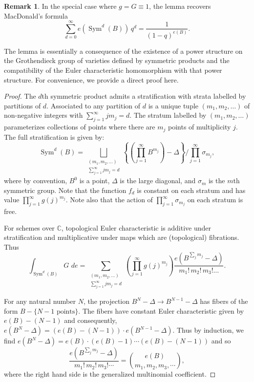 \documentclass[12pt]{amsart}
\theoremstyle{definition}
\newtheorem{remark}[theorem]{Remark}
\newcommand{\CC} {\mathbb{C}}          %
\newcommand{\Sym}{\operatorname{Sym}}
\begin{document}
\begin{remark} \label{MacD}
In the special case where $g=G\equiv  1$, the lemma recovers
MacDonald's formula $$\sum _{d=0}^{\infty }e (\Sym ^{d} (B)) \, q^{d} =
\frac{1}{(1-q)^{e (B)}}.$$ 

The lemma is essentially a consequence of the existence of a power
structure on the Grothendieck group of varieties defined by
symmetric products and the compatibility of the Euler characteristic
homomorphism with that power structure. For convenience, we provide a
direct proof here.
\end{remark}
\begin{proof}
The $d$th symmetric product admits a stratification with strata
labelled by partitions of $d$. Associated to any partition of $d$ is a
unique tuple $(m_{1},m_{2},\dots )$ of non-negative integers with
$\sum _{j=1}^{\infty }j m_{j}=d$. The stratum labelled by
$(m_{1},m_{2},\dots )$ parameterizes collections of points where there
are $m_{j}$ points of multiplicity $j$. The full stratification is
given by:
\[
\Sym ^{d} (B) = \bigsqcup_{\begin{smallmatrix} (m_{1},m_{2},\dots )\\
\sum _{j=1}^{\infty }j m_{j}=d  \end{smallmatrix}} \left\{\left(\prod _{j=1}^{\infty }B^{m_{j}} \right) -\Delta  \right\}/ \prod _{j=1}^{\infty }\sigma _{m_{j}}, 
\]
where by convention, $B^{0}$ is a point, $\Delta $ is the large
diagonal, and $\sigma _{m}$ is the $m$th symmetric group. Note that
the function $f_{d}$ is constant on each stratum and has value $\prod
_{j=1}^{\infty }g (j)^{m_{j}}$. Note also that the action of $\prod
_{j=1}^{\infty }\sigma _{m_{j}}$ on each stratum is free. 

For schemes over $\CC $, topological Euler characteristic is additive
under stratification and multiplicative under maps which are
(topological) fibrations. Thus
\[
\int _{\Sym ^{d} (B)} G\,\, de = \sum _{\begin{smallmatrix}(m_{1},m_{2},\dots )\\
\sum _{j=1}^{\infty }j m_{j}=d   \end{smallmatrix}} \left(\prod _{j=1}^{\infty } g (j)^{m_{j}} \right) \frac{e (B^{\sum _{j}m_{j}}-\Delta )}{m_{1}!\, m_{2}!\, m_{3}!\dots }.
\]

For any natural number $N$, the projection $B^{N}-\Delta \to
B^{N-1}-\Delta $ has fibers of the form $B-\{N-1\text{ points}
\}$. The fibers have constant Euler characteristic given by $e (B)-
(N-1)$ and consequently, $e (B^{N}-\Delta )= (e (B)- (N-1))\cdot e
(B^{N-1}-\Delta )$. Thus by induction, we find $e (B^{N}-\Delta ) = e
(B)\cdot (e (B)-1)\cdots (e (B)- (N-1))$ and so 
\[
\frac{e (B^{\sum _{j}m_{j}}-\Delta )}{m_{1}!\,m_{2}!\,m_{3}!\cdots } = \binom{e (B)}{m_{1},m_{2},m_{3},\cdots },
\]
where the right hand side is the generalized multinomial coefficient.


\end{proof}
\end{document}

